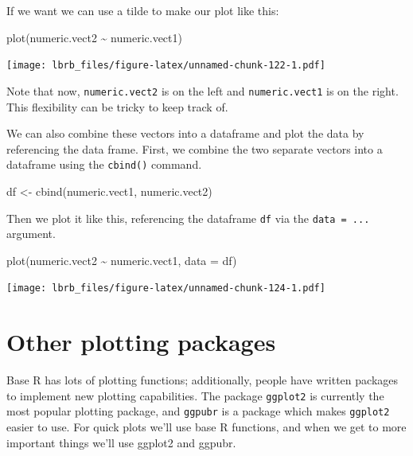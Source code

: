 \documentclass[
]{book}
\newenvironment{Shaded}{\begin{snugshade}}{\end{snugshade}}
\newcommand{\AttributeTok}[1]{\textcolor[rgb]{0.77,0.63,0.00}{#1}}
\newcommand{\FunctionTok}[1]{\textcolor[rgb]{0.00,0.00,0.00}{#1}}
\newcommand{\NormalTok}[1]{#1}
\newcommand{\OtherTok}[1]{\textcolor[rgb]{0.56,0.35,0.01}{#1}}
\newcommand{\SpecialCharTok}[1]{\textcolor[rgb]{0.00,0.00,0.00}{#1}}
\begin{document}
If we want we can use a tilde to make our plot like this:

\begin{Shaded}
\begin{Highlighting}[]
\FunctionTok{plot}\NormalTok{(numeric.vect2 }\SpecialCharTok{\textasciitilde{}}\NormalTok{ numeric.vect1)}
\end{Highlighting}
\end{Shaded}

\texttt{[image: lbrb\_files/figure-latex/unnamed-chunk-122-1.pdf]}

Note that now, \texttt{numeric.vect2} is on the left and \texttt{numeric.vect1} is on the right. This flexibility can be tricky to keep track of.

We can also combine these vectors into a dataframe and plot the data by referencing the data frame. First, we combine the two separate vectors into a dataframe using the \texttt{cbind()} command.

\begin{Shaded}
\begin{Highlighting}[]
\NormalTok{df }\OtherTok{\textless{}{-}} \FunctionTok{cbind}\NormalTok{(numeric.vect1, numeric.vect2)}
\end{Highlighting}
\end{Shaded}

Then we plot it like this, referencing the dataframe \texttt{df} via the \texttt{data\ =\ ...} argument.

\begin{Shaded}
\begin{Highlighting}[]
\FunctionTok{plot}\NormalTok{(numeric.vect2 }\SpecialCharTok{\textasciitilde{}}\NormalTok{ numeric.vect1, }\AttributeTok{data =}\NormalTok{ df)}
\end{Highlighting}
\end{Shaded}

\texttt{[image: lbrb\_files/figure-latex/unnamed-chunk-124-1.pdf]}

\hypertarget{other-plotting-packages}{%
\section{Other plotting packages}\label{other-plotting-packages}}

Base R has lots of plotting functions; additionally, people have written packages to implement new plotting capabilities. The package \texttt{ggplot2} is currently the most popular plotting package, and \texttt{ggpubr} is a package which makes \texttt{ggplot2} easier to use. For quick plots we'll use base R functions, and when we get to more important things we'll use ggplot2 and ggpubr.
\end{document}
